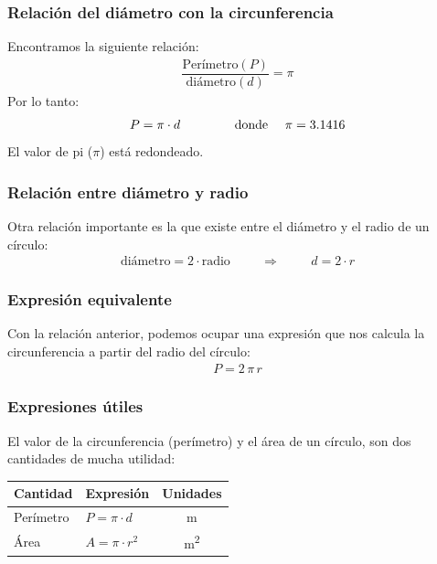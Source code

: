 \documentclass[14pt]{beamer}
\begin{document}
\begin{frame}
\frametitle{Relación del diámetro con la circunferencia}
Encontramos la siguiente relación:
\pause
\begin{align*}
\dfrac{\text{Perímetro} (P)}{\text{diámetro} (d)} = \pi
\end{align*}
\pause
Por lo tanto:
\pause
\begin{align*}
P = \pi \cdot d \hspace{1.5cm} \text{donde } \quad \pi = 3.1416
\end{align*}
El valor de pi ($\pi$) está redondeado.
\end{frame}
\begin{frame}
\frametitle{Relación entre diámetro y radio}
Otra relación importante es la que existe entre el diámetro y el radio de un círculo:
\pause
\begin{align*}
\text{diámetro} = 2 \cdot \text{radio} \hspace{1cm} \Rightarrow \hspace{1cm} d = 2 \cdot r
\end{align*}
\pause
\vspace*{-1cm}
\begin{figure}
    \centering
\end{figure}
\end{frame}
\begin{frame}
\frametitle{Expresión equivalente}
Con la relación anterior, podemos ocupar una expresión que nos calcula la circunferencia a partir del radio del círculo:
\pause
\begin{align*}
P = 2 \, \pi \, r
\end{align*}
\end{frame}
\begin{frame}
\frametitle{Expresiones útiles}
El valor de la circunferencia (perímetro) y el área de un círculo, son dos cantidades de mucha utilidad:
\pause
\begin{table}
\centering
\begin{tabular}{l | l | c}
Cantidad & Expresión & Unidades \\ \hline
Perímetro & $P = \pi \cdot d$ & \unit{\meter} \\ \hline
Área & $A = \pi \cdot r^{2}$ & \unit{\square\meter}
\end{tabular}
\end{table}
\end{frame}
\end{document}
